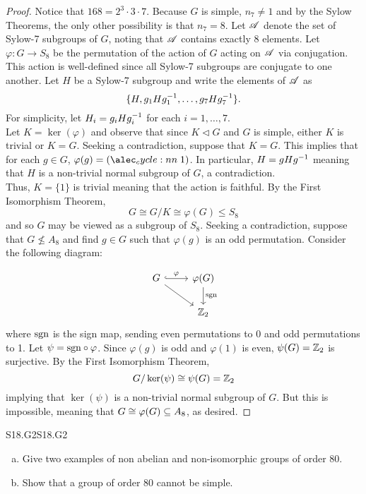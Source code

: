 \documentclass[../../AlgebraQualSolutions.tex]{subfiles}
\begin{document}
	\begin{proof}
		Notice that $168 = 2^3\cdot3\cdot7$. Because $G$ is simple, $n_7 \neq 1$ and by the Sylow Theorems, the only other possibility is that $n_7 = 8$. Let $\mathscr{A}$ denote the set of Sylow-7 subgroups of $G$, noting that $\mathscr{A}$ contains exactly 8 elements. Let $\varphi: G \to S_8$ be the permutation of the action of $G$ acting on $\mathscr{A}$ via conjugation. This action is well-defined since all Sylow-7 subgroups are conjugate to one another. Let $H$ be a Sylow-7 subgroup and write the elements of $\mathscr{A}$ as
			\[\{H, g_1 Hg_1^{-1}, \ldots, g_7Hg_7^{-1}\}.\]
		For simplicity, let $H_i = g_iHg_i^{-1}$ for each $i = 1, \ldots, 7$.\\

		Let $K = \ker(\varphi)$ and observe that since $K \triangleleft G$ and $G$ is simple, either $K$ is trivial or $K = G$. Seeking a contradiction, suppose that $K = G$. This implies that for each $g \in G$, $\varphi(g) = \cycle{1}$. In particular, $H = gHg^{-1}$ meaning that $H$ is a non-trivial normal subgroup of $G$, a contradiction.\\

		Thus, $K = \{1\}$ is trivial meaning that the action is faithful. By the First Isomorphism Theorem,
			\[G \cong G/K \cong \varphi(G) \leq S_8\]
		and so $G$ may be viewed as a subgroup of $S_8$. Seeking a contradiction, suppose that $G \not\leq A_8$ and find $g \in G$ such that $\varphi(g)$ is an odd permutation. Consider the following diagram:

		\[
			\begin{tikzcd}
				G \ar[r, "\varphi", hook] \ar[dr] & \varphi(G) \ar[d,"\rm{sgn}"]\\
				& \Z_2
			\end{tikzcd}
			\]
		where $\rm{sgn}$ is the sign map, sending even permutations to 0 and odd permutations to 1. Let $\psi = \rm{sgn}\circ \varphi$. Since $\varphi(g)$ is odd and $\varphi(1)$ is even, $\psi(G) = \mathbb{Z}_2$ is surjective. By the First Isomorphism Theorem,
			\[G/\ker(\psi) \cong \psi(G) = \mathbb{Z}_2\]
		implying that $\ker(\psi)$ is a non-trivial normal subgroup of $G$. But this is impossible, meaning that $G \cong \varphi(G) \subseteq A_8$, as desired.
	\end{proof}

	\begin{prob}{S18.G2}{S18.G2}
		\begin{enumerate}[(a)]
			\item Give two examples of non abelian and non-isomorphic groups of order 80.
			\item Show that a group of order 80 cannot be simple.
		\end{enumerate}
	\end{prob}
\end{document}

